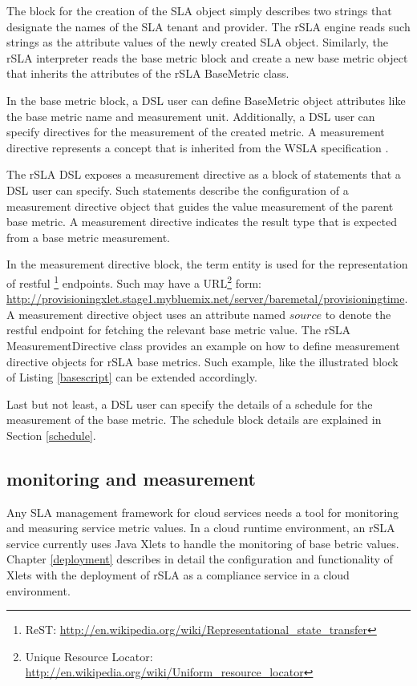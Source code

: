 The block for the creation of the SLA object simply describes two strings that designate the names of the SLA tenant and provider. The rSLA engine reads such strings as the attribute values of the newly created SLA object. Similarly, the rSLA interpreter reads the base metric block and create a new base metric object that inherits the attributes of the rSLA BaseMetric class. 

In the base metric block, a DSL user can define BaseMetric object attributes like the base metric name and measurement unit. Additionally, a DSL user can specify directives for the measurement of the created metric. A measurement directive represents a concept that is inherited from the WSLA specification \cite{wsla}. 

The rSLA DSL exposes a measurement directive as a block of statements that a DSL user can specify. Such statements describe the configuration of a measurement directive object that guides the value measurement of the parent base metric. A measurement directive indicates the result type that is expected from a base metric measurement.

In the measurement directive block, the term entity is used for the representation of restful \footnote{ReST: \url{http://en.wikipedia.org/wiki/Representational_state_transfer}} endpoints. Such may have a URL\footnote{Unique Resource Locator: \url{http://en.wikipedia.org/wiki/Uniform_resource_locator}} form: \url{http://provisioningxlet.stage1.mybluemix.net/server/baremetal/provisioningtime}. A measurement directive object uses an attribute named $source$ to denote the restful endpoint for fetching the relevant base metric value. The rSLA MeasurementDirective class provides an example on how to define measurement directive objects for rSLA base metrics. Such example, like the illustrated block of Listing \ref{basescript} can be extended accordingly. 

Last but not least, a DSL user can specify the details of a schedule for the measurement of the base metric. The schedule block details are explained in Section \ref{schedule}.

\subsection{monitoring and measurement}
Any SLA management framework for cloud services needs a tool for monitoring and measuring service metric values. In a cloud runtime environment, an rSLA service currently uses Java Xlets \cite{xlets} to handle the monitoring of base betric values. Chapter \ref{deployment} describes in detail the configuration and functionality of Xlets with the deployment of rSLA as a compliance service in a cloud environment.

